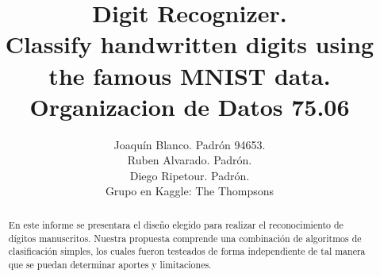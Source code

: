 \documentclass[a4paper,11pt]{report}
\title{Digit Recognizer. \\ 
  Classify handwritten digits using the famous MNIST data.\\
  Organizacion de Datos 75.06}
\author{Joaquín Blanco. Padrón 94653.\\
  Ruben Alvarado. Padrón.\\
  Diego Ripetour. Padrón.\\
  Grupo en Kaggle: The Thompsons}
\begin{document}
\maketitle
\tableofcontents

\begin{abstract}
En este informe se presentara el diseño elegido para realizar el reconocimiento de dígitos manuscritos. Nuestra propuesta comprende una combinación de algoritmos de clasificación simples, los cuales fueron testeados de forma independiente de tal manera que se puedan determinar aportes y limitaciones.
\end{abstract}

\end{document}
